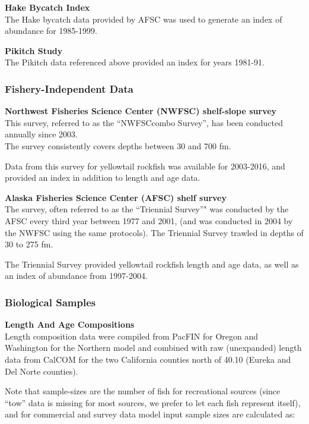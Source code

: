 \documentclass[12pt,]{article}
\begin{document}
\textbf{Hake Bycatch Index}\\
The Hake bycatch data provided by AFSC was used to generate an index of
abundance for 1985-1999.

\textbf{Pikitch Study}\\
The Pikitch data referenced above provided an index for years 1981-91.

\subsubsection{Fishery-Independent Data}\label{fishery-independent-data}

\textbf{Northwest Fisheries Science Center (NWFSC) shelf-slope survey}\\
This survey, referred to as the ``NWFSCcombo Survey'', has been
conducted annually since 2003.\\
The survey consistently covers depths between 30 and 700 fm.

Data from this survey for yellowtail rockfish was available for
2003-2016, and provided an index in addition to length and age data.

\textbf{Alaska Fisheries Science Center (AFSC) shelf survey}\\
The survey, often referred to as the ``Triennial Survey''" was conducted
by the AFSC every third year between 1977 and 2001, (and was conducted
in 2004 by the NWFSC using the same protocols). The Triennial Survey
trawled in depths of 30 to 275 fm.

The Triennial Survey provided yellowtail rockfish length and age data,
as well as an index of abundance from 1997-2004.

\subsubsection{Biological Samples}\label{biological-samples}

\textbf{Length And Age Compositions}\\
Length composition data were compiled from PacFIN for Oregon and
Washington for the Northern model and combined with raw (unexpanded)
length data from CalCOM for the two California counties north of 40.10
(Eureka and Del Norte counties).

Note that sample-sizes are the number of fish for recreational sources
(since ``tow'' data is missing for most sources, we prefer to let each
fish represent itself), and for commercial and survey data model input
sample sizes are calculated as:
\end{document}
